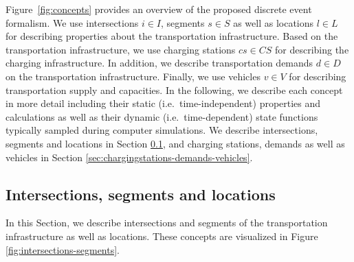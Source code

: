 \documentclass[graybox]{svmult}
\begin{document}
Figure~\ref{fig:concepts} provides an overview of the proposed discrete event formalism.
We use intersections $i \in I$, segments $s \in S$ as well as locations $l \in L$ for describing properties about the transportation infrastructure.
Based on the transportation infrastructure, we use charging stations $cs \in CS$ for describing the charging infrastructure.
In addition, we describe transportation demands $d \in D$ on the transportation infrastructure. 
Finally, we use vehicles $v \in V$ for describing transportation supply and capacities.
In the following, we describe each concept in more detail including their static (i.e.\ time-independent) properties and calculations as well as their dynamic (i.e.\ time-dependent) state functions typically sampled during computer simulations.
We describe intersections, segments and locations in Section \ref{sec:intersections-segments}, and charging stations, demands as well as vehicles in Section \ref{sec:chargingstations-demands-vehicles}.

\subsection{Intersections, segments and locations}
\label{sec:intersections-segments}

In this Section, we describe intersections and segments of the transportation infrastructure as well as locations. These concepts are visualized in Figure \ref{fig:intersections-segments}.
\end{document}
